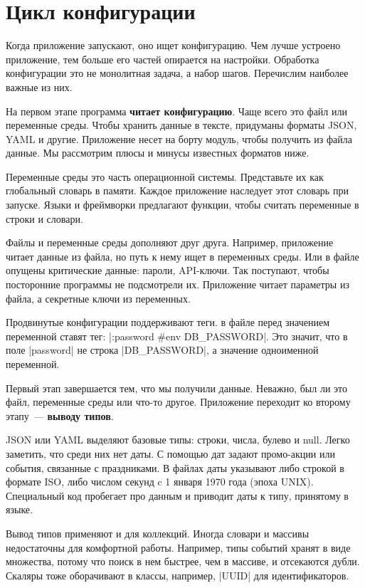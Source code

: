 \section{Цикл конфигурации}

Когда приложение запускают, оно ищет конфигурацию. Чем лучше устроено
приложение, тем больше его частей опирается на настройки. Обработка конфигурации
это не монолитная задача, а набор шагов. Перечислим наиболее важные из них.

На первом этапе программа \textbf{читает конфигурацию}. Чаще всего это файл или
переменные среды. Чтобы хранить данные в тексте, придуманы форматы JSON, YAML и
другие. Приложение несет на борту модуль, чтобы получить из файла данные. Мы
рассмотрим плюсы и минусы известных форматов ниже.

Переменные среды это часть операционной системы. Представьте их как глобальный
словарь в памяти. Каждое приложение наследует этот словарь при запуске. Языки и
фреймворки предлагают функции, чтобы считать переменные в строки и словари.

Файлы и переменные среды дополняют друг друга. Например, приложение читает
данные из файла, но путь к нему ищет в переменных среды. Или в файле опущены
критические данные: пароли, API-ключи. Так поступают, чтобы посторонние
программы не подсмотрели их. Приложение читает параметры из файла, а секретные
ключи из переменных.

Продвинутые конфигурации поддерживают теги. в файле перед значением переменной
ставят тег: \spverb|:password #env DB_PASSWORD|. Это значит, что в поле
\spverb|password| не строка \spverb|DB_PASSWORD|, а значение одноименной
переменной.

Первый этап завершается тем, что мы получили данные. Неважно, был ли это файл,
переменные среды или что-то другое. Приложение переходит ко второму этапу~---
\textbf{выводу типов}.

JSON или YAML выделяют базовые типы: строки, числа, булево и null. Легко
заметить, что среди них нет даты. С помощью дат задают промо-акции или события,
связанные с праздниками. В файлах даты указывают либо строкой в формате ISO,
либо числом секунд c 1 января 1970 года (эпоха UNIX). Специальный код пробегает
про данным и приводит даты к типу, принятому в языке.

Вывод типов применяют и для коллекций. Иногда словари и массивы недостаточны для
комфортной работы. Например, типы событий хранят в виде множества, потому что
поиск в нем быстрее, чем в массиве, и отсекаются дубли. Скаляры тоже оборачивают
в классы, например, \spverb|UUID| для идентификаторов.

